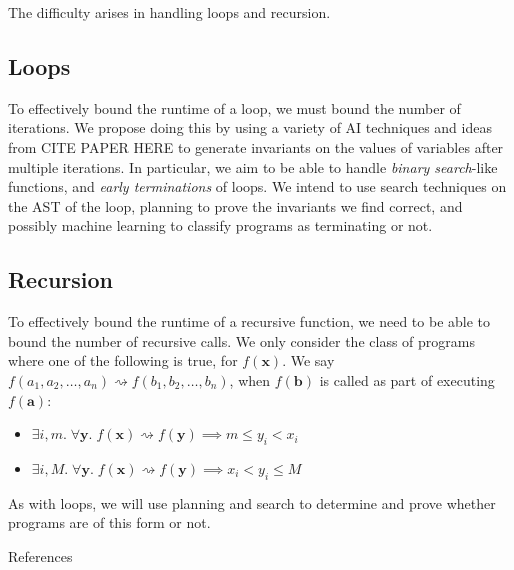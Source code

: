 \documentclass{mfcs}
\begin{document}
The difficulty arises in handling loops and recursion.

{\color{colour}\subsection{Loops}}

To effectively bound the runtime of a loop, we must bound the number of
iterations. We propose doing this by using a variety of AI techniques and ideas
from CITE PAPER HERE to generate invariants on the values of variables after
multiple iterations. In particular, we aim to be able to handle \emph{binary
  search}-like functions, and \emph{early terminations} of loops. We intend to
use search techniques on the AST of the loop, planning to prove the invariants
we find correct, and possibly machine learning to classify programs as
terminating or not.

{\color{colour}\subsection{Recursion}}

To effectively bound the runtime of a recursive function, we need to be able to
bound the number of recursive calls. We only consider the class of programs
where one of the following is true, for $f(\textbf{x})$. We say $f(a_1, a_2,
\dots, a_n) \rightsquigarrow f(b_1, b_2, \dots, b_n)$, when $f(\textbf{b})$ is
called as part of executing $f(\textbf{a})$:
\begin{itemize}
\item $\exists i,m.\; \forall \textbf{y}.\; f(\textbf{x}) \rightsquigarrow
  f(\textbf{y}) \implies m \le y_i < x_i$
\item $\exists i,M.\; \forall \textbf{y}.\; f(\textbf{x}) \rightsquigarrow
  f(\textbf{y}) \implies x_i < y_i \le M$
\end{itemize}

As with loops, we will use planning and search to determine and prove whether
programs are of this form or not.


\begin{question}{References}
\end{question}
\end{document}
